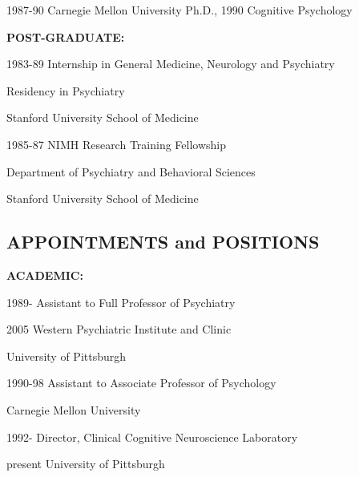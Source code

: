 \documentclass[10 pt]{article}
\begin{document}
1987-90 Carnegie Mellon University \hspace{0.99in} Ph.D., 1990 Cognitive Psychology
    \vspace{0.2in}

{\fontsize{12pt}{16 pt}\selectfont \textbf{POST-GRADUATE:}}
    \smallskip

1983-89 Internship in General Medicine, Neurology and Psychiatry

\hspace{0.46in} Residency in Psychiatry

\hspace{0.46in} Stanford University School of Medicine
    \smallskip

1985-87 NIMH Research Training Fellowship

\hspace{0.46in} Department of Psychiatry and Behavioral Sciences


\hspace{0.46in} Stanford University School of Medicine

    \newpage


    \begin{center}
\section*{APPOINTMENTS and POSITIONS} \label{secAaP}
    \end{center}
    \vspace{0.2in}

{\fontsize{13pt}{16 pt}\selectfont \textbf{ACADEMIC:}}
    \smallskip

1989- \hspace{0.4in} Assistant to Full Professor of Psychiatry

2005 \hspace{0.44in} Western Psychiatric Institute and Clinic

\hspace{0.77in} University of Pittsburgh
    \smallskip

1990-98 \hspace{0.27in} Assistant to Associate Professor of Psychology

\hspace{0.78in} Carnegie Mellon University
    \smallskip

1992- \hspace{0.41in} Director, Clinical Cognitive Neuroscience Laboratory

present \hspace{0.29in} University of Pittsburgh
    \smallskip
\end{document}

